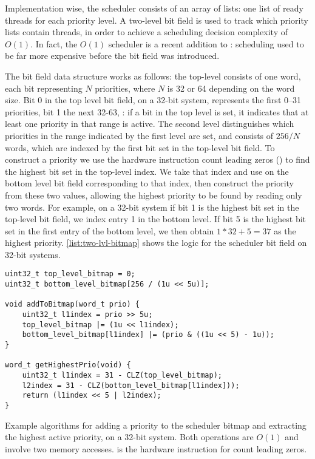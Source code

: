 Implementation wise, the scheduler consists of an array of lists: one list of ready threads for each
priority level. A two-level bit field is used to track which priority lists contain threads, 
in order to achieve a scheduling decision complexity of $O(1)$. In fact, the \(O(1)\) scheduler is a
recent addition to \selfour: scheduling used to be far more expensive before the bit field was
introduced.

The bit field data structure works as follows: the
top-level consists of one word, each bit representing $N$ priorities, where $N$ is 32 or 64
depending on the word size. Bit 0 in the top level bit field, on a 32-bit system, represents the first 0--31
priorities, bit 1 the next 32-63, \etc: if a bit in the top level is set, it indicates that at least
one priority in that range is active. 
The second level distinguishes which priorities in the
range indicated by the first level are set, and consists of $256/N$ words, which are indexed by the first bit set in the
top-level bit field. To construct a priority we use the hardware instruction count leading zeros
() to find the highest bit set in the top-level index. We take that index and use
 on the bottom level bit field corresponding to that index, then construct the priority
from these two values, allowing the highest priority to be found by reading only two words. For
example, on a 32-bit system 
if bit 1 is the highest bit set in the top-level bit field, we index entry 1 in the
bottom level. If bit 5 is the highest bit set in the first entry of the bottom level, we then obtain
$1 * 32 + 5 = 37$ as the highest priority. 
\cref{list:two-lvl-bitmap} shows the logic for the scheduler bit field on 32-bit systems.

\begin{listing}
    \begin{verbatim}
uint32_t top_level_bitmap = 0;
uint32_t bottom_level_bitmap[256 / (1u << 5u)];

void addToBitmap(word_t prio) {
    uint32_t l1index = prio >> 5u;
    top_level_bitmap |= (1u << l1index);
    bottom_level_bitmap[l1index] |= (prio & ((1u << 5) - 1u));
}

word_t getHighestPrio(void) {
    uint32_t l1index = 31 - CLZ(top_level_bitmap);
    l2index = 31 - CLZ(bottom_level_bitmap[l1index]));
    return (l1index << 5 | l2index);
}
    \end{verbatim}
    \caption[Scheduler bitmap algorithm.]{Example algorithms for adding a priority to the scheduler bitmap and extracting the highest
        active priority, on a 32-bit system. Both operations are $O(1)$ and involve two memory
        accesses. 
     is the hardware instruction for count leading zeros.}
    \label{list:two-lvl-bitmap}
\end{listing}

